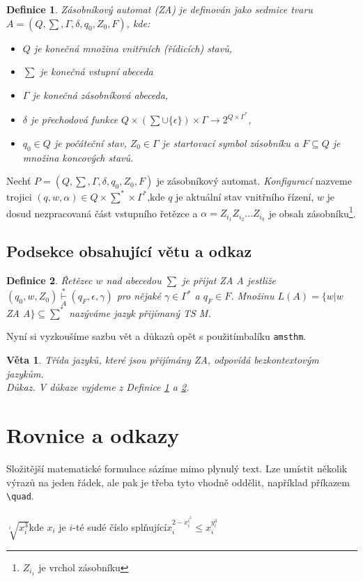 \documentclass[11pt, a4paper, twocolumn]{article}
\newtheorem{dfnc}{Definice}
\newtheorem{veta}{Věta}
\begin{document}
\begin{dfnc}
    \label{def1}
    \textup{Zásobníkový automat} (ZA) je definován jako
    sedmice tvaru $ A = (Q, \sum, \Gamma, \delta, q_0, Z_0, F)$, kde:
\begin{itemize}
    \item $Q$ je konečná množina \textup{vnitřních (řídicích) stavů,}
    \item $\sum$ je konečná \textup{vstupní abeceda}
    \item $\Gamma$ je konečná \textup{zásobníková abeceda,}
    \item $\delta$ je \textup{přechodová funkce} $Q\times(\sum\cup\{\epsilon\})\times\Gamma \rightarrow 2^{Q\times\Gamma^\ast}$,
    \item $q_0 \in Q$ je \textup{počáteční stav}, $Z_0 \in \Gamma$ je \textup{startovací symbol zásobníku} a $F \subseteq Q$ je množina \textup{koncových stavů}.
\end{itemize}
\end{dfnc}

Nechť $P = (Q, \sum, \Gamma, \delta, q_0, Z_0, F)$ je zásobníkový automat. \textit{Konfigurací} nazveme trojici $(q, w, \alpha)\in{Q}\times\sum^\ast\times\Gamma^\ast$,kde $q$ je aktuální stav vnitřního řízení, $w$ je dosud nezpracovaná část vstupního řetězce a $\alpha = Z_{i_1}Z_{i_2}. . . Z_{i_k}$ je obsah zásobníku\footnote{$Z_{i_1}$ je vrchol zásobníku}.

\subsection{Podsekce obsahující větu a odkaz}
\begin{dfnc}
\label{def2}
  \textup{Řetězec} $w$ \textup{nad abecedou} $\sum$ \textup{je přijat ZA} A jestliže $(q_0, w, Z_0)\underset{A}{\overset{\ast}{\vdash}} (q_F , \epsilon, \gamma)$ pro nějaké $\gamma \in \Gamma^\ast$ a $q_F \in F$. Množinu $L(A) = \{w | w$  ZA A$\} \subseteq \sum^\ast$ nazýváme \textup{jazyk přijímaný TS M.}
\end{dfnc}
  
  Nyní si vyzkoušíme sazbu vět a důkazů opět s použitímbalíku  \texttt{amsthm}.
\begin{veta}
    Třída jazyků, které jsou přijímány ZA, odpovídá
    \textup{bezkontextovým jazykům.}
    \\
    Důkaz. \textup{V důkaze vyjdeme z Definice \ref{def1} a \ref{def2}}. 
\end{veta}

\section{Rovnice a odkazy}
Složitější matematické formulace sázíme mimo plynulý
text. Lze umístit několik výrazů na jeden řádek, ale pak je
třeba tyto vhodně oddělit, například příkazem \texttt{\textbackslash quad}.\\
\\ 
$\sqrt[i]{x^3_i}$\quad  kde $x_i$ je $i$-té sudé číslo splňující\quad $x^{2-x^{i^2}_i}_i \leq x^{y^3_i}_i$\\
   
\end{document}
